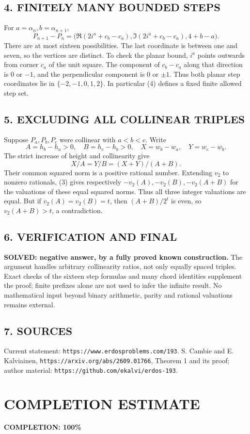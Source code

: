 \subsection*{4. FINITELY MANY BOUNDED STEPS}
For $a=\alpha_n,b=\alpha_{n+1}$,
\[
 P_{n+1}-P_n=
 \bigl(\Re(2i^a+c_b-c_a),\Im(2i^a+c_b-c_a),4+b-a\bigr). \tag{4}
\]
There are at most sixteen possibilities. The last coordinate is between one and seven, so the vertices are distinct. To check the planar bound, $i^a$ points outwards from corner $c_a$ of the unit square. The component of $c_b-c_a$ along that direction is $0$ or $-1$, and the perpendicular component is $0$ or $\pm1$. Thus both planar step coordinates lie in $\{-2,-1,0,1,2\}$. In particular (4) defines a fixed finite allowed step set.
\subsection*{5. EXCLUDING ALL COLLINEAR TRIPLES}
Suppose $P_a,P_b,P_c$ were collinear with $a<b<c$. Write
\[
 A=h_b-h_a>0,\quad B=h_c-h_b>0,\quad
 X=w_b-w_a,\quad Y=w_c-w_b.
\]
The strict increase of height and collinearity give
\[
 X/A=Y/B=(X+Y)/(A+B).
\]
Their common squared norm is a positive rational number. Extending $v_2$ to nonzero rationals, (3) gives respectively $-v_2(A),-v_2(B),-v_2(A+B)$ for the valuations of these equal squared norms. Thus all three integer valuations are equal. But if $v_2(A)=v_2(B)=t$, then $(A+B)/2^t$ is even, so $v_2(A+B)>t$, a contradiction.
\subsection*{6. VERIFICATION AND FINAL}
\textbf{SOLVED: negative answer, by a fully proved known construction.}
The argument handles arbitrary collinearity ratios, not only equally spaced triples. Exact checks of the sixteen step formulas and many chord identities supplement the proof; finite prefixes alone are not used to infer the infinite result. No mathematical input beyond binary arithmetic, parity and rational valuations remains external.
\subsection*{7. SOURCES}
Current statement: \texttt{https://www.erdosproblems.com/193}. S. Cambie and E. Kalviainen, \texttt{https://arxiv.org/abs/2609.01766}, Theorem 1 and its proof; author material: \texttt{https://github.com/ekalvi/erdos-193}.
\section{COMPLETION ESTIMATE}
\textbf{COMPLETION: 100\%}
